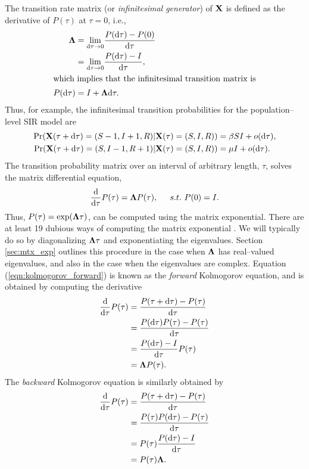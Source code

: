The transition rate matrix (or \textit{infinitesimal generator}) of $ \mathbf{X} $ is defined as the derivative of $ P(\tau) $ at $ \tau = 0 $, i.e.,
\begin{align*}
\label{eqn:ctmc_generator}
\boldsymbol{\Lambda} &= \underset{\mathrm{d}\tau \rightarrow 0}{\lim}\frac{P(\mathrm{d}\tau) - P(0)}{\mathrm{d}\tau} \\
&= \underset{\mathrm{d}\tau \rightarrow 0}{\lim}\frac{P(\mathrm{d}\tau) - I}{\mathrm{d}\tau}, \\
\shortintertext{which implies that the infinitesimal transition matrix is} P(\mathrm{d}\tau) &= I + \boldsymbol{\Lambda}\mathrm{d}\tau.
\end{align*}
Thus, for example, the infinitesimal transition probabilities for the population--level SIR model are
\begin{align*}
\Pr(\mathbf{X}(\tau+\mathrm{d}\tau) = (S-1, I+1, R) | \mathbf{X}(\tau) = (S,I,R)) &= \beta SI + o(\mathrm{d}\tau), \\
\Pr(\mathbf{X}(\tau+\mathrm{d}\tau) = (S, I-1, R+1) | \mathbf{X}(\tau) = (S,I,R)) &= \mu I + o(\mathrm{d}\tau).
\end{align*}
The transition probability matrix over an interval of arbitrary length, $ \tau $, solves the matrix differential equation,  \begin{equation}\label{eqn:kolmogorov_forward}
\frac{\mathrm{d}}{\mathrm{d}\tau}P(\tau) = \boldsymbol{\Lambda} P(\tau),\hspace{0.2in} s.t.\  P(0) = I.
\end{equation} 
Thus, $ P(\tau) = \exp(\boldsymbol{\Lambda}\tau) $, can be computed using the matrix exponential. There are at least 19 dubious ways of computing the matrix exponential \cite{moler2003nineteen}. We will typically do so by diagonalizing $ \boldsymbol{\Lambda}\tau $ and exponentiating the eigenvalues. Section \ref{sec:mtx_exp} outlines this procedure in the case when $ \boldsymbol{\Lambda}$ has real--valued eigenvalues, and also in the case when the eigenvalues are complex. Equation (\ref{eqn:kolmogorov_forward}) is known as the \textit{forward} Kolmogorov equation, and is obtained by computing the derivative
\begin{align*}
\frac{\mathrm{d}}{\mathrm{d}\tau}P(\tau) &= \frac{P(\tau + \mathrm{d}\tau) - P(\tau)}{\mathrm{d}\tau} \\
&= \frac{P(\mathrm{d}\tau)P(\tau) - P(\tau)}{\mathrm{d}\tau} \\
&= \frac{P(\mathrm{d}\tau) - I}{\mathrm{d}\tau}P(\tau)\\
&= \boldsymbol{\Lambda} P(\tau).
\end{align*}
The \textit{backward} Kolmogorov equation is similarly obtained by
\begin{align}
\frac{\mathrm{d}}{\mathrm{d}\tau}P(\tau) &= \frac{P(\tau + \mathrm{d}\tau) - P(\tau)}{\mathrm{d}\tau} \nonumber \\
&= \frac{P(\tau)P(\mathrm{d}\tau) - P(\tau)}{\mathrm{d}\tau} \nonumber \\
&= P(\tau)\frac{P(\mathrm{d}\tau) - I}{\mathrm{d}\tau}\nonumber\\
&= P(\tau)\boldsymbol{\Lambda} .
\end{align}

